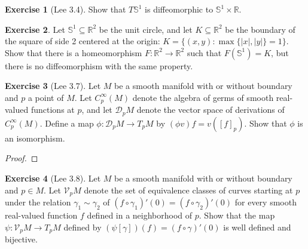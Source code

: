 \documentclass{article}
\newcommand{\bR}{\mathbb{R}}
\newcommand{\bS}{\mathbb{S}}
\newcommand{\cD}{\mathcal{D}}
\newcommand{\cV}{\mathcal{V}}
\theoremstyle{definition}
\newtheorem{exercise}{Exercise}
\begin{document}
\begin{exercise}[Lee 3.4]
    Show that $T \bS^1$ is diffeomorphic to $\bS^1 \times \bR$. 
\end{exercise}

\begin{exercise}
    Let $\bS^1 \subseteq \bR^2$ be the unit circle, and let $K \subseteq \bR^2$ be the boundary of the square of side 2 centered at the origin: $K = \{(x,y) \colon \max\{|x|, |y|\} = 1\}$. Show that there is a homeomorphism $F: \bR^2 \to \bR^2$ such that $F(\bS^1) = K$, but there is no diffeomorphism with the same property.  
\end{exercise}

\begin{exercise}[Lee 3.7]
    Let $M$ be a smooth manifold with or without boundary and $p$ a point of $M$. Let $C_p^{\infty}(M)$ denote the algebra of germs of smooth real-valued functions at $p$, and let $\cD_pM$ denote the vector space of derivations of $C_p^{\infty}(M)$. Define a map $\phi: \cD_pM \to T_pM$ by $(\phi v)f = v([f]_p)$. Show that $\phi$ is an isomorphism.
\end{exercise}

\begin{proof}
    
\end{proof}

\begin{exercise}[Lee 3.8]
    Let $M$ be a smooth manifold with or without boundary and $p \in M$. Let $\cV_p M$ denote the set of equivalence classes of curves starting at $p$ under the relation $\gamma_1 \sim \gamma_2$ of $(f \circ \gamma_1)'(0) = (f \circ \gamma_2)'(0)$ for every smooth real-valued function $f$ defined in a neighborhood of $p$. Show that the map $\psi: \cV_pM \to T_pM$ defined by $(\psi[\gamma])(f) = (f \circ \gamma)'(0)$ is well defined and bijective.  
\end{exercise}
\end{document}
